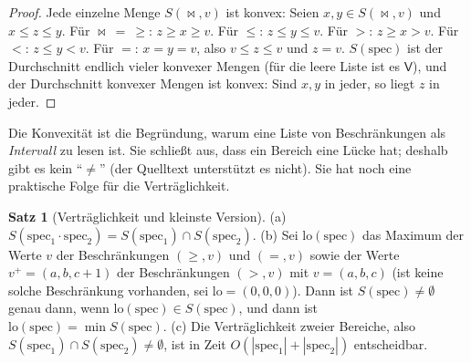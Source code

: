 \documentclass[a4paper,12pt,twoside]{report}
\DeclareRobustCommand{\_}{\ifmmode\mbox{\textunderscore}\else\textunderscore\allowbreak{}\fi}
\theoremstyle{definition}
\newtheorem{satz}{Satz}[chapter]
\begin{document}
\begin{proof}
	Jede einzelne Menge $S(\bowtie,v)$ ist konvex: Seien $x,y\in S(\bowtie,v)$ und $x\le z\le y$. Für $\bowtie\ =\ \ge$: $z\ge x\ge v$. Für $\le$: $z\le y\le v$. Für $>$: $z\ge x>v$. Für $<$: $z\le y<v$. Für $=$: $x=y=v$, also $v\le z\le v$ und $z=v$. $S(\mathrm{spec})$ ist der Durchschnitt endlich vieler konvexer Mengen (für die leere Liste ist es $\mathsf V$), und der Durchschnitt konvexer Mengen ist konvex: Sind $x,y$ in jeder, so liegt $z$ in jeder.
\end{proof}

Die Konvexität ist die Begründung, warum eine Liste von Beschränkungen als \emph{Intervall} zu lesen ist. Sie schließt aus, dass ein Bereich eine Lücke hat; deshalb gibt es kein ``$\ne$'' (der Quelltext unterstützt es nicht). Sie hat noch eine praktische Folge für die Verträglichkeit.

\begin{satz}[Verträglichkeit und kleinste Version]
	\label{satz:bereich}
	(a) $S(\mathrm{spec}_1\cdot\mathrm{spec}_2)=S(\mathrm{spec}_1)\cap S(\mathrm{spec}_2)$. (b) Sei $\mathrm{lo}(\mathrm{spec})$ das Maximum der Werte $v$ der Beschränkungen $(\ge,v)$ und $(=,v)$ sowie der Werte $v^{+}=(a,b,c+1)$ der Beschränkungen $(>,v)$ mit $v=(a,b,c)$ (ist keine solche Beschränkung vorhanden, sei $\mathrm{lo}=(0,0,0)$). Dann ist $S(\mathrm{spec})\ne\emptyset$ genau dann, wenn $\mathrm{lo}(\mathrm{spec})\in S(\mathrm{spec})$, und dann ist $\mathrm{lo}(\mathrm{spec})=\min S(\mathrm{spec})$. (c) Die Verträglichkeit zweier Bereiche, also $S(\mathrm{spec}_1)\cap S(\mathrm{spec}_2)\ne\emptyset$, ist in Zeit $O(|\mathrm{spec}_1|+|\mathrm{spec}_2|)$ entscheidbar.
\end{satz}
\end{document}

